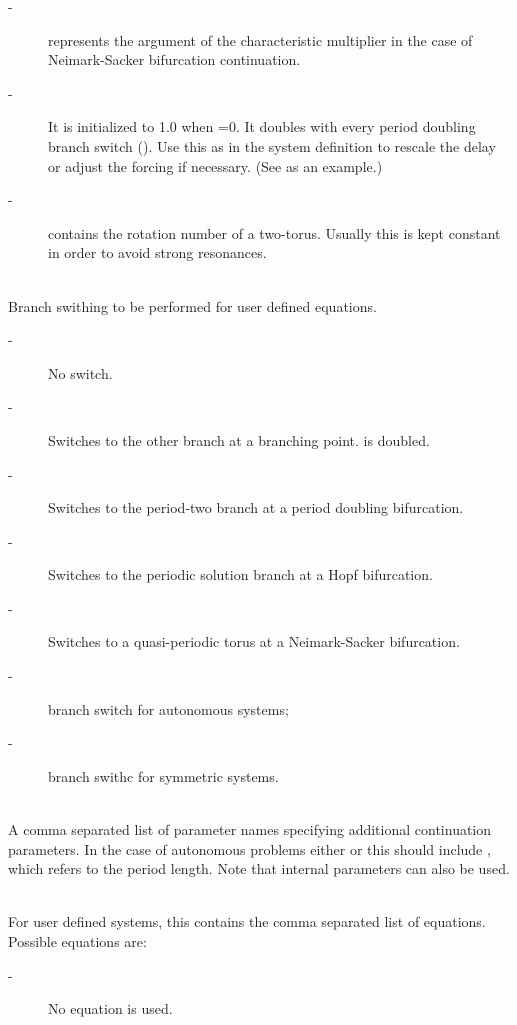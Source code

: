 \documentclass[10pt,a4paper]{ddedoc}
\begin{document}
\begin{description}
\begin{description}
\item[ -] represents the argument of the characteristic multiplier in the case of
Neimark-Sacker bifurcation continuation.
\item[ -] It is initialized to 1.0 when =0. It doubles with
every period doubling branch switch (). Use this as  in the
system definition to rescale the delay or adjust the forcing if necessary. (See  as an example.)
\item[ -] contains the rotation number of a two-torus. Usually this is kept
constant in order to avoid strong resonances.
\end{description}
%
\item[\funp{switch}] ~\\
Branch swithing to be performed for user defined equations.
\begin{description}
\item[ -] No switch.
\item[ -] Switches to the other branch at a branching point.  is doubled.
\item[ -] Switches to the period-two branch at a period doubling
bifurcation.
\item[ -] Switches to the periodic solution branch at a Hopf
bifurcation.
\item[ -] Switches to a quasi-periodic torus at a Neimark-Sacker
bifurcation.
\item[ -] branch switch for autonomous systems;
\item[ -] branch swithc for symmetric systems.
\end{description}
%
\item[\funp{parx}] ~\\
A comma separated list of parameter names specifying additional continuation parameters. In
the case of autonomous problems either  or this should include
, which refers to the period length. Note that internal parameters can also be used.
%
\item[\funp{eqns}] ~\\
For user defined systems, this contains the comma separated list of equations. Possible equations are:
\begin{description}
\item[ -] No equation is used.

\end{description}
\end{description}
\end{document}

